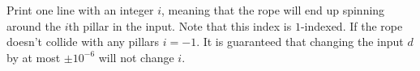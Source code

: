 

Print one line with an integer $i$, meaning that the rope will end up spinning around the $i$th
pillar in the input. Note that this index is $1$-indexed. 
If the rope doesn't collide with any pillars $i = -1$. It is guaranteed that changing the input $d$ by at most
$\pm 10^{-6}$ will not change $i$.

